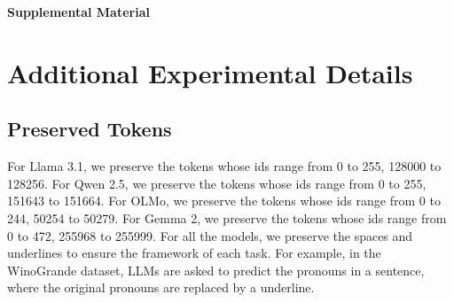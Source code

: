 \documentclass[11pt]{article}
\begin{document}


\newpage



\appendix
\onecolumn


\begin{center}
{\Large \textbf{Supplemental Material}}
\end{center}


\section{Additional Experimental Details}
\subsection{Preserved Tokens}
\label{appendix:reserved}
For Llama 3.1, we preserve the tokens whose ids range from 0 to 255, 128000 to 128256.
For Qwen 2.5, we preserve the tokens whose ids range from 0 to 255, 151643 to 151664.
For OLMo, we preserve the tokens whose ids range from 0 to 244, 50254 to 50279.
For Gemma 2, we preserve the tokens whose ids range from 0 to 472, 255968 to 255999.
For all the models, we preserve the spaces and underlines to ensure the framework of each task.
For example, in the WinoGrande dataset, LLMs are asked to predict the pronouns in a sentence, where the original pronouns are replaced by a underline.
\end{document}
